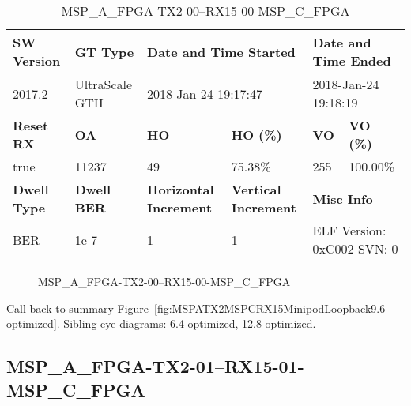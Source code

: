 \begin{table}[h]
\centering
\caption{MSP\_A\_FPGA-TX2-00--RX15-00-MSP\_C\_FPGA}
\label{tab:MSPAFPGATX200RX1500MSPCFPGA9.6-optimized}
\begin{tabular}{@{}|l|l|l|l|l|l|@{}}
\toprule
\textbf{SW Version}                & \textbf{GT Type}   & \multicolumn{2}{l|}{\textbf{Date and Time Started}}            & \multicolumn{2}{l|}{\textbf{Date and Time Ended}}        \\ \midrule
2017.2                       & UltraScale GTH          & \multicolumn{2}{l|}{2018-Jan-24 19:17:47}                   & \multicolumn{2}{l|}{2018-Jan-24 19:18:19}               \\ \midrule
\textbf{Reset RX}                  & \textbf{OA} & \textbf{HO}   & \textbf{HO (\%)} & \textbf{VO} & \textbf{VO (\%)} \\ \midrule
true & 11237        & 49          & 75.38\%        & 255        & 100.00\%       \\ \midrule
\textbf{Dwell Type}                & \textbf{Dwell BER} & \textbf{Horizontal Increment} & \textbf{Vertical Increment}    & \multicolumn{2}{l|}{\textbf{Misc Info}}                  \\ \midrule
BER                            & 1e-7        & 1        & 1           & \multicolumn{2}{l|}{ELF Version: 0xC002 SVN: 0}                         \\ \bottomrule
\end{tabular}
\end{table}

\begin{figure}[h]
\caption{MSP\_A\_FPGA-TX2-00--RX15-00-MSP\_C\_FPGA} \label{fig:MSPAFPGATX200RX1500MSPCFPGA9.6-optimized}
\end{figure}

Call back to summary Figure~\ref{fig:MSPATX2MSPCRX15MinipodLoopback9.6-optimized}.
Sibling eye diagrams: \hyperref[sec:MSPAFPGATX200RX1500MSPCFPGA6.4-optimized]{6.4-optimized}, \hyperref[sec:MSPAFPGATX200RX1500MSPCFPGA12.8-optimized]{12.8-optimized}.

\clearpage
\newpage


\subsection{MSP\_A\_FPGA-TX2-01--RX15-01-MSP\_C\_FPGA}\label{sec:MSPAFPGATX201RX1501MSPCFPGA9.6-optimized}

